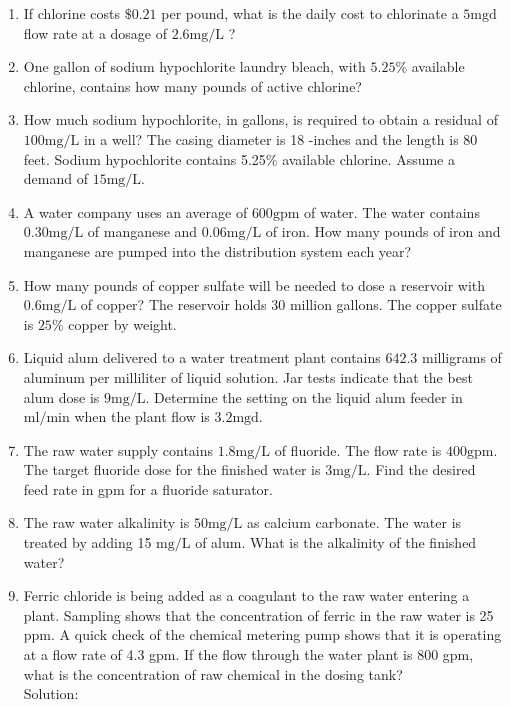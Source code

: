 \documentclass{article}
\begin{document}
\begin{enumerate}
  \item If chlorine costs $\$ 0.21$ per pound, what is the daily cost to chlorinate a $5 \mathrm{mgd}$ flow rate at a dosage of $2.6 \mathrm{mg} / \mathrm{L}$ ?

  \item One gallon of sodium hypochlorite laundry bleach, with $5.25 \%$ available chlorine, contains how many pounds of active chlorine?

  \item How much sodium hypochlorite, in gallons, is required to obtain a residual of $100 \mathrm{mg} / \mathrm{L}$ in a well? The casing diameter is 18 -inches and the length is 80 feet. Sodium hypochlorite contains 5.25\% available chlorine. Assume a demand of $15 \mathrm{mg} / \mathrm{L}$.

  \item A water company uses an average of $600 \mathrm{gpm}$ of water. The water contains $0.30 \mathrm{mg} / \mathrm{L}$ of manganese and $0.06 \mathrm{mg} / \mathrm{L}$ of iron. How many pounds of iron and manganese are pumped into the distribution system each year?

  \item How many pounds of copper sulfate will be needed to dose a reservoir with $0.6 \mathrm{mg} / \mathrm{L}$ of copper? The reservoir holds 30 million gallons. The copper sulfate is $25 \%$ copper by weight.

  \item Liquid alum delivered to a water treatment plant contains $642.3$ milligrams of aluminum per milliliter of liquid solution. Jar tests indicate that the best alum dose is $9 \mathrm{mg} / \mathrm{L}$. Determine the setting on the liquid alum feeder in $\mathrm{ml} / \mathrm{min}$ when the plant flow is $3.2 \mathrm{mgd}$.

  \item The raw water supply contains $1.8 \mathrm{mg} / \mathrm{L}$ of fluoride. The flow rate is $400 \mathrm{gpm}$. The target fluoride dose for the finished water is $3 \mathrm{mg} / \mathrm{L}$. Find the desired feed rate in gpm for a fluoride saturator.

  \item The raw water alkalinity is $50 \mathrm{mg} / \mathrm{L}$ as calcium carbonate. The water is treated by adding 15 $\mathrm{mg} / \mathrm{L}$ of alum. What is the alkalinity of the finished water?

\vspace{0.2cm}
\item Ferric chloride is being added as a coagulant to the raw water entering a plant. Sampling shows that the concentration of ferric in the raw water is 25 ppm. A quick check of the chemical metering pump shows that it is operating at a flow rate of 4.3 gpm. If the flow through the water plant is 800 gpm, what is the concentration of raw chemical in the dosing tank?\\
\vspace{0.2cm}
Solution:\\
\vspace{0.3cm}
\begin{tikzpicture}


\end{tikzpicture}
\end{enumerate}
\end{document}
